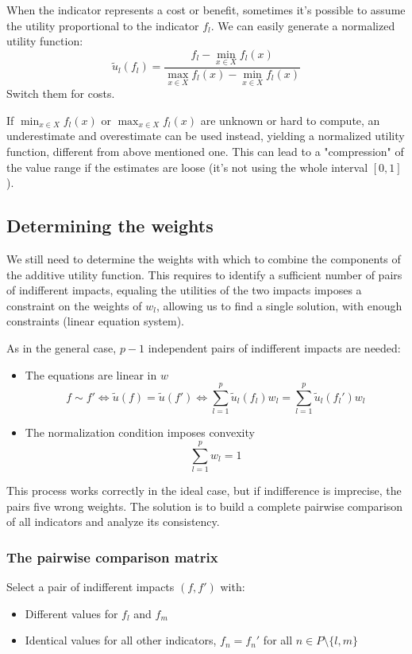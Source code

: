 When the indicator represents a cost or benefit, sometimes it's possible to assume the utility proportional to the indicator $f_l$. We can easily generate a normalized utility function:
$$ \tilde u_l (f_l) = \frac{f_l - \min_{x \in X} f_l (x)}{\max_{x \in X} f_l (x) - \min_{x \in X} f_l (x)} $$
Switch them for costs.

If $\min_{x \in X} f_l (x)$ or $\max_{x \in X} f_l (x)$ are unknown or hard to compute, an underestimate and overestimate can be used instead, yielding a normalized utility function, different from above mentioned one. This can lead to a "compression" of the value range if the estimates are loose (it's not using the whole interval $[0,1]$).

\subsection{Determining the weights}
\label{subsec:detweights}

We still need to determine the weights with which to combine the components of the additive utility function. This requires to identify a sufficient number of pairs of indifferent impacts, equaling the utilities of the two impacts imposes a constraint on the weights of $w_l$, allowing us to find a single solution, with enough constraints (linear equation system).

As in the general case, $p-1$ independent pairs of indifferent impacts are needed: 
\begin{itemize}
	\item The equations are linear in $w$ 
	$$ f \sim f' \Leftrightarrow \tilde u (f) = \tilde u (f') \Leftrightarrow \sum_{l = 1}^p \tilde u_l (f_l) w_l = \sum_{l = 1}^p \tilde u_l (f_l') w_l$$
	
	\item The normalization condition imposes convexity 
	$$ \sum_{l = 1}^p w_l = 1$$
\end{itemize}

This process works correctly in the ideal case, but if indifference is imprecise, the pairs five wrong weights. The solution is to build a complete pairwise comparison of all indicators and analyze its consistency.

\subsubsection{The pairwise comparison matrix}

Select a pair of indifferent impacts $(f, f')$ with:
\begin{itemize}
	\item Different values for $f_l$ and $f_m$
	
	\item Identical values for all other indicators, $f_n = f_n'$ for all $n \in P \setminus \{l, m\}$
\end{itemize}

